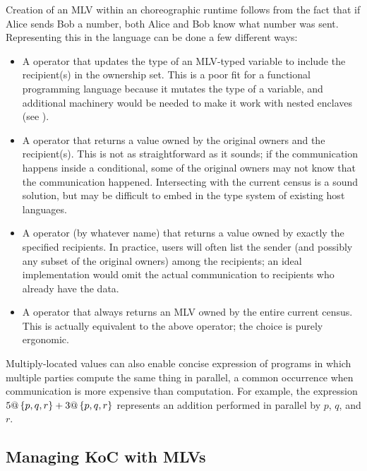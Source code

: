 Creation of an MLV within an choreographic runtime follows from the fact that
if Alice sends Bob a number, both Alice and Bob know what number was sent.
Representing this in the language can be done a few different ways:
\begin{itemize}
  \item A  operator that updates the type of an MLV-typed variable to include the recipient(s) in the ownership set.
        This is a poor fit for a functional programming language because it mutates the type of a variable,
        and additional machinery would be needed to make it work with nested enclaves (see ).
  \item A  operator that returns a value owned by the original owners and the recipient(s).
        This is not as straightforward as it sounds; if the communication happens inside a conditional,
        some of the original owners may not know that the communication happened.
        Intersecting with the current census is a sound solution,
        but may be difficult to embed in the type system of existing host languages.
  \item A  operator (by whatever name) that returns a value owned by exactly the specified recipients.
        In practice, users will often list the sender (and possibly any subset of the original owners) among the recipients;
        an ideal implementation would omit the actual communication to recipients who already have the data.
  \item A  operator that always returns an MLV owned by the entire current census.
        This is actually equivalent to the above  operator; the choice is purely ergonomic.
\end{itemize}

Multiply-located values can also enable concise expression of programs in which multiple parties compute the same thing in parallel,
a common occurrence when communication is more expensive than computation.
For example, the \HLSCentral expression $5@\left\{p,q,r\right\}+3@\left\{p,q,r\right\}$ represents an addition performed in parallel by $p$, $q$, and $r$.

\subsection{Managing KoC with MLVs}
\label{sec:enclaves}


